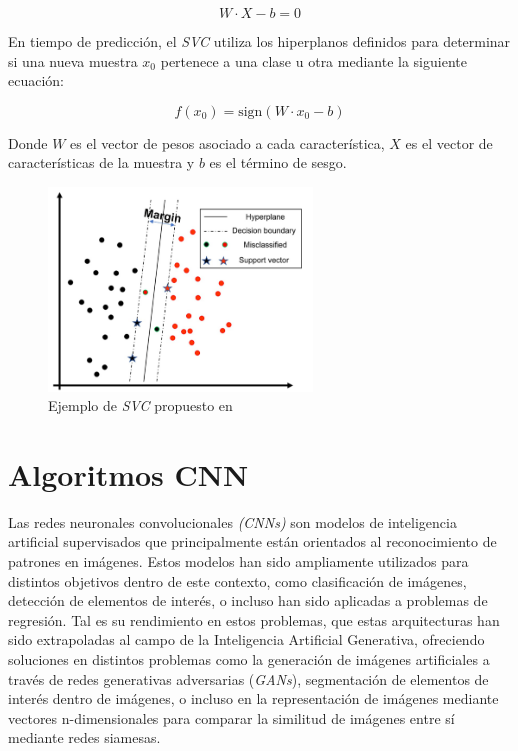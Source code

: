 \[
W \cdot X - b = 0
\]

En tiempo de predicción, el \textit{SVC} utiliza los hiperplanos definidos para determinar si una nueva muestra $x_0$ pertenece a una clase u otra mediante la siguiente ecuación:

\[
f({x_0}) = \text{sign}({W} \cdot {x_0} - b)
\]

Donde $W$ es el vector de pesos asociado a cada característica, $X$ es el vector de características de la muestra y $b$ es el término de sesgo.

\begin{figure}[H]
	\centering
	\includegraphics[width=7cm]{Figures/Background/SVC.png}
	\caption{Ejemplo de \textit{SVC} propuesto en \cite{MISRA2020243}}
	\label{SVC_BACKGROUND}
\end{figure}

\section{Algoritmos CNN}
\label{CNN_SECTION}



Las redes neuronales convolucionales \textit{(CNNs)} son modelos de inteligencia artificial supervisados que principalmente están orientados al reconocimiento de patrones en imágenes. Estos modelos han sido ampliamente utilizados para distintos objetivos dentro de este contexto, como clasificación de imágenes, detección de elementos de interés, o incluso han sido aplicadas a problemas de regresión. Tal es su rendimiento en estos problemas, que estas arquitecturas han sido extrapoladas al campo de la Inteligencia Artificial Generativa, ofreciendo soluciones en distintos problemas como la generación de imágenes artificiales a través de redes generativas adversarias (\textit{GANs}), segmentación de elementos de interés dentro de imágenes, o incluso en la representación de imágenes mediante vectores n-dimensionales para comparar la similitud de imágenes entre sí mediante redes siamesas.

